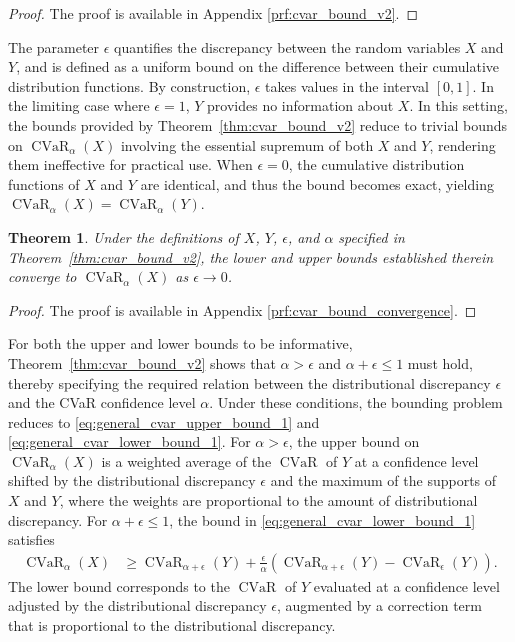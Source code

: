 \documentclass[acmlarge, manuscript, screen, review, natbib=false, oneside]{acmart}
\newtheorem{theorem}{Theorem}[section]
\DeclareMathOperator{\CVaR}{CVaR}
\begin{document}
\begin{proof}
	The proof is available in Appendix \ref{prf:cvar_bound_v2}.
\end{proof}
The parameter $\epsilon$ quantifies the discrepancy between the random variables $X$ and $Y$, and is defined as a uniform bound on the difference between their cumulative distribution functions. By construction, $\epsilon$ takes values in the interval $[0,1]$. In the limiting case where $\epsilon = 1$, $Y$ provides no information about $X$. In this setting, the bounds provided by Theorem~\ref{thm:cvar_bound_v2} reduce to trivial bounds on $\CVaR_\alpha(X)$ involving the essential supremum of both $X$ and $Y$, rendering them ineffective for practical use. When $\epsilon = 0$, the cumulative distribution functions of $X$ and $Y$ are identical, and thus the bound becomes exact, yielding $\CVaR_\alpha(X) = \CVaR_\alpha(Y)$. 
\begin{theorem}\label{thm:cvar_bound_convergence}
	Under the definitions of $X$, $Y$, $\epsilon$, and $\alpha$ specified in Theorem~\ref{thm:cvar_bound_v2}, the lower and upper bounds established therein converge to $\CVaR_\alpha(X)$ as $\epsilon \to 0$.
\end{theorem}
\begin{proof}
	The proof is available in Appendix \ref{prf:cvar_bound_convergence}.
\end{proof}
For both the upper and lower bounds to be informative, Theorem~\ref{thm:cvar_bound_v2} shows that $\alpha > \epsilon$ and $\alpha + \epsilon \leq 1$ must hold, thereby specifying the required relation between the distributional discrepancy $\epsilon$ and the CVaR confidence level $\alpha$. Under these conditions, the bounding problem reduces to \eqref{eq:general_cvar_upper_bound_1} and \eqref{eq:general_cvar_lower_bound_1}. For $\alpha > \epsilon$, the upper bound on $\CVaR_\alpha(X)$ is a weighted average of the $\CVaR$ of $Y$ at a confidence level shifted by the distributional discrepancy $\epsilon$ and the maximum of the supports of $X$ and $Y$, where the weights are proportional to the amount of distributional discrepancy. For $\alpha+\epsilon \leq 1$, the bound in \eqref{eq:general_cvar_lower_bound_1} satisfies
\begin{equation}
	\begin{aligned}
		\CVaR_{\alpha}(X) &\geq \CVaR_{\alpha+\epsilon}(Y) 
		+ \frac{\epsilon}{\alpha}(\CVaR_{\alpha+\epsilon}(Y)- \CVaR_{\epsilon}(Y)).
	\end{aligned}
\end{equation}
The lower bound corresponds to the $\CVaR$ of $Y$ evaluated at a confidence level adjusted by the distributional discrepancy $\epsilon$, augmented by a correction term that is proportional to the distributional discrepancy.
\end{document}
